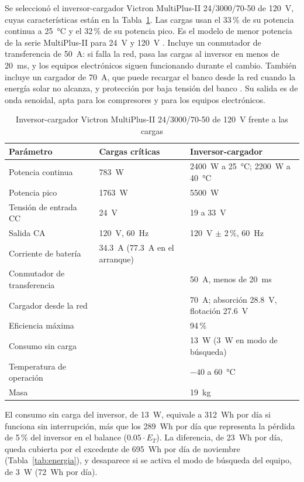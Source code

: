 Se seleccionó el inversor-cargador Victron MultiPlus-II 24/3000/70-50 de \SI{120}{V}, cuyas características están en la Tabla~\ref{tab:inversor}. Las cargas usan el 33\,\% de su potencia continua a \SI{25}{\celsius} y el 32\,\% de su potencia pico. Es el modelo de menor potencia de la serie MultiPlus-II para \SI{24}{V} y \SI{120}{V} \cite{victron_mp}. Incluye un conmutador de transferencia de \SI{50}{A}: si falla la red, pasa las cargas al inversor en menos de \SI{20}{ms}, y los equipos electrónicos siguen funcionando durante el cambio. También incluye un cargador de \SI{70}{A}, que puede recargar el banco desde la red cuando la energía solar no alcanza, y protección por baja tensión del banco \cite{victron_mp}. Su salida es de onda senoidal, apta para los compresores y para los equipos electrónicos.

\begin{table}[!htb]
\caption{Inversor-cargador Victron MultiPlus-II 24/3000/70-50 de \SI{120}{V} \cite{victron_mp} frente a las cargas}
\label{tab:inversor}
\centering
\footnotesize
\setlength{\tabcolsep}{3pt}
\begin{tabular}{l l l}
\toprule
Parámetro & Cargas críticas & Inversor-cargador \\
\midrule
Potencia continua & \SI{783}{W} & \SI{2400}{W} a \SI{25}{\celsius}; \SI{2200}{W} a \SI{40}{\celsius} \\
Potencia pico & \SI{1763}{W} & \SI{5500}{W} \\
Tensión de entrada CC & \SI{24}{V} & 19 a \SI{33}{V} \\
Salida CA & \SI{120}{V}, \SI{60}{Hz} & \SI{120}{V} $\pm$ 2\,\%, \SI{60}{Hz} \\
Corriente de batería & \SI{34.3}{A} (\SI{77.3}{A} en el arranque) & \\
Conmutador de transferencia & & \SI{50}{A}, menos de \SI{20}{ms} \\
Cargador desde la red & & \SI{70}{A}; absorción \SI{28.8}{V}, flotación \SI{27.6}{V} \\
Eficiencia máxima & & 94\,\% \\
Consumo sin carga & & \SI{13}{W} (\SI{3}{W} en modo de búsqueda) \\
Temperatura de operación & & $-40$ a \SI{60}{\celsius} \\
Masa & & \SI{19}{kg} \\
\bottomrule
\end{tabular}
\end{table}

El consumo sin carga del inversor, de \SI{13}{W}, equivale a \SI{312}{Wh} por día si funciona sin interrupción, más que los \SI{289}{Wh} por día que representa la pérdida de 5\,\% del inversor en el balance ($0.05\cdot E_T$). La diferencia, de \SI{23}{Wh} por día, queda cubierta por el excedente de \SI{695}{Wh} por día de noviembre (Tabla~\ref{tab:energia}), y desaparece si se activa el modo de búsqueda del equipo, de \SI{3}{W} (\SI{72}{Wh} por día).

